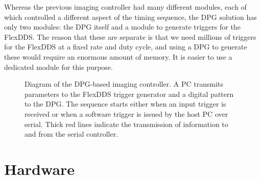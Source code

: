 \documentclass[]{article}
\begin{document}
Whereas the previous imaging controller had many different modules, each of which controlled a different aspect of the timing sequence, the DPG solution has only two modules: the DPG itself and a module to generate triggers for the FlexDDS.  The reason that these are separate is that we need millions of triggers for the FlexDDS at a fixed rate and duty cycle, and using a DPG to generate these would require an enormous amount of memory.  It is easier to use a dedicated module for this purpose.
\begin{figure}[htbp]
	\centering
	\caption{Diagram of the DPG-based imaging controller. A PC transmits parameters to the FlexDDS trigger generator and a digital pattern to the DPG.  The sequence starts either when an input trigger is received or when a software trigger is issued by the host PC over serial.  Thick red lines indicate the transmission of information to and from the serial controller.}
	\label{fg:diagram}
\end{figure}

\section{Hardware}
\label{sec:hardware}
\end{document}
